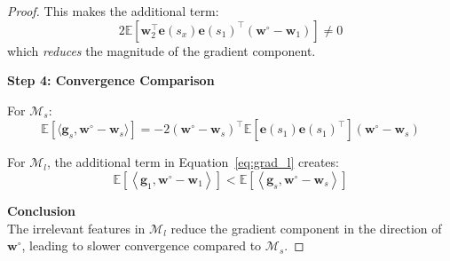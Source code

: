 \begin{proof}
This makes the additional term:
\[
2 \mathbb{E}\left[\mathbf{w}_2^\top \mathbf{e}(s_x)\mathbf{e}(s_1)^\top (\mathbf{w}^\circ - \mathbf{w}_1)\right] \neq 0
\]
which \textit{reduces} the magnitude of the gradient component.

\noindent \textbf{Step 4: Convergence Comparison}

For \( \mathcal{M}_s \):
\[
\mathbb{E}\left[\langle \mathbf{g}_s, \mathbf{w}^\circ - \mathbf{w}_s \rangle \right] = -2 (\mathbf{w}^\circ - \mathbf{w}_s)^\top \mathbb{E}\left[\mathbf{e}(s_1)\mathbf{e}(s_1)^\top\right] (\mathbf{w}^\circ - \mathbf{w}_s)
\]

For \( \mathcal{M}_l \), the additional term in Equation~\ref{eq:grad_l} creates:
\[
\mathbb{E}\left[ \left\langle \mathbf{g}_1, \mathbf{w}^\circ - \mathbf{w}_1 \right\rangle \right] < \mathbb{E}\left[ \left\langle \mathbf{g}_s, \mathbf{w}^\circ - \mathbf{w}_s \right\rangle \right]
\]

\noindent \textbf{Conclusion} \\
The irrelevant features in \( \mathcal{M}_l \) reduce the gradient component in the direction of \( \mathbf{w}^\circ \), leading to slower convergence compared to \( \mathcal{M}_s \).
\end{proof}